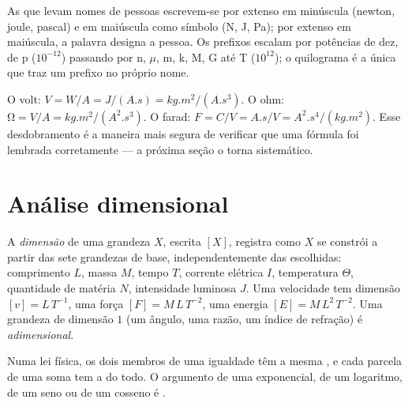 \begin{remark}\label{rem:b1:units-dimensions:names}
As  que levam nomes de pessoas escrevem-se por extenso em
minúscula (newton, joule, pascal) e em maiúscula como símbolo
(\unit{N}, \unit{J}, \unit{Pa}); por extenso em maiúscula, a palavra
designa a pessoa. Os prefixos escalam por potências de dez, de p
($10^{-12}$) passando por n, $\mu$, m, k, M, G até T
($10^{12}$); o quilograma
é a única  que traz um prefixo no próprio nome.
\end{remark}

\begin{example}\label{ex:b1:units-dimensions:unpack}
O volt: $\unit{V} = \unit{W/A} = \unit{J/(A.s)} = \unit{kg.m^2/(A.s^3)}$.
O ohm: $\unit{\ohm} = \unit{V/A} = \unit{kg.m^2/(A^2.s^3)}$. O farad:
$\unit{F} = \unit{C/V} = \unit{A.s/V} = \unit{A^2.s^4/(kg.m^2)}$. Esse
desdobramento é a maneira mais segura de verificar que uma fórmula foi
lembrada corretamente --- a próxima seção o torna sistemático.
\end{example}

\section{Análise dimensional}

\begin{definition}[Dimensão]\label{def:b1:units-dimensions:dimension}
A \emph{dimensão} de uma grandeza $X$, escrita $[X]$, registra como $X$
se constrói a partir das sete grandezas de base, independentemente das 
escolhidas: comprimento $L$, massa $M$, tempo $T$, corrente elétrica $I$,
temperatura $\Theta$, quantidade de matéria $N$, intensidade luminosa $J$.
Uma velocidade tem dimensão $[v] = L\,T^{-1}$, uma força
$[F] = M\,L\,T^{-2}$, uma energia $[E] = M\,L^2\,T^{-2}$. Uma grandeza de
dimensão $1$ (um ângulo, uma razão, um índice de refração) é
\emph{adimensional}.
\end{definition}

\begin{theorem}\label{thm:b1:units-dimensions:homogeneity}
Numa lei física, os dois membros de uma igualdade têm a mesma ,
e cada parcela de uma soma tem a  do todo. O argumento de
uma exponencial, de um logaritmo, de um seno ou de um cosseno é .
\end{theorem}

